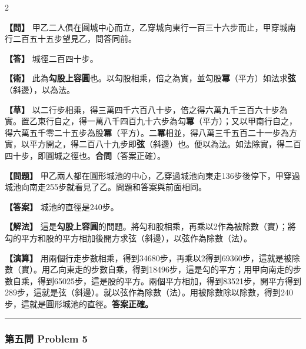 \documentclass[11pt,a4paper]{article}
\newcommand{\wen}[1]{\par\noindent\textbf{\color{problemcolor}【問】} #1\par}
\newcommand{\da}[1]{\par\noindent\textbf{\color{problemcolor}【答】} #1\par}
\newcommand{\shu}[1]{\par\noindent\textbf{\color{problemcolor}【術】} #1\par}
\newcommand{\cao}[1]{\par\noindent\textbf{\color{problemcolor}【草】} #1\par}
\newcommand{\wenm}[1]{\par\noindent\textbf{\color{problemcolor}【問題】} #1\par}
\newcommand{\dam}[1]{\par\noindent\textbf{\color{problemcolor}【答案】} #1\par}
\newcommand{\shum}[1]{\par\noindent\textbf{\color{problemcolor}【解法】} #1\par}
\newcommand{\caom}[1]{\par\noindent\textbf{\color{problemcolor}【演算】} #1\par}
\begin{document}
\begin{paracol}{2}
\wen{甲乙二人俱在圓城中心而立，乙穿城向東行一百三十六步而止，甲穿城南行二百五十五步望見乙，問答同前。}

\da{城徑二百四十步。}

\shu{此為\textbf{勾股上容圓}也。以勾股相乘，倍之為實，並勾股\textbf{冪}（平方）如法求\textbf{弦}（斜邊），以為法。}

\cao{以二行步相乘，得三萬四千六百八十步，倍之得六萬九千三百六十步為實。置乙東行自之，得一萬八千四百九十六步為勾\textbf{冪}（平方）；又以甲南行自之，得六萬五千零二十五步為股\textbf{冪}（平方）。二\textbf{冪}相並，得八萬三千五百二十一步為方實，以平方開之，得二百八十九步即\textbf{弦}（斜邊）也。便以為法。如法除實，得二百四十步，即圓城之徑也。\textbf{合問}（答案正確）。}

\switchcolumn
\wenm{甲乙兩人都在圓形城池的中心，乙穿過城池向東走136步後停下，甲穿過城池向南走255步就看見了乙。問題和答案與前面相同。}

\dam{城池的直徑是240步。}

\shum{這是\textbf{勾股上容圓}的問題。將勾和股相乘，再乘以2作為被除數（實）；將勾的平方和股的平方相加後開方求弦（斜邊），以弦作為除數（法）。}

\caom{用兩個行走步數相乘，得到34680步，再乘以2得到69360步，這就是被除數（實）。用乙向東走的步數自乘，得到18496步，這是勾的平方；用甲向南走的步數自乘，得到65025步，這是股的平方。兩個平方相加，得到83521步，開平方得到289步，這就是弦（斜邊）。就以弦作為除數（法）。用被除數除以除數，得到240步，這就是圓形城池的直徑。\textbf{答案正確。}}
\end{paracol}

\vspace{0.5cm}
\noindent\textcolor{rulecolor}{\rule{\textwidth}{0.4pt}}

\subsubsection*{第五問 \quad Problem 5}
\end{document}
